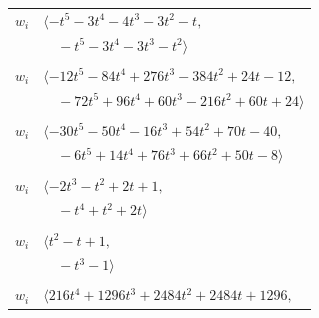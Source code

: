 \documentclass[11pt]{article}
\begin{document}
\begin{longtable}{@{}ll@{}}
$w_i$ & $\langle -t^{5}-3t^{4}-4t^{3}-3t^{2}-t,$\\
 & $\quad -t^{5}-3t^{4}-3t^{3}-t^{2}\rangle$\\
\addlinespace[2pt]
\multicolumn{2}{@{}p{0.97\textwidth}@{}}{$i=39$, $D_i=1$, $\rho_{ij}$: $0{:}2, \allowbreak 3{:}1, \allowbreak 5{:}2, \allowbreak 7{:}2, \allowbreak 11{:}1, \allowbreak 13{:}1, \allowbreak 14{:}2, \allowbreak 16{:}2, \allowbreak 20{:}2, \allowbreak 22{:}2, \allowbreak 23{:}1, \allowbreak 25{:}2, \allowbreak 28{:}1, \allowbreak 30{:}1, \allowbreak 31{:}1, \allowbreak 36{:}2, \allowbreak 41{:}1, \allowbreak 43{:}1, \allowbreak 45{:}1$}\\
$w_i$ & $\langle -12t^{5}-84t^{4}+276t^{3}-384t^{2}+24t-12,$\\
 & $\quad -72t^{5}+96t^{4}+60t^{3}-216t^{2}+60t+24\rangle$\\
\addlinespace[2pt]
\multicolumn{2}{@{}p{0.97\textwidth}@{}}{$i=40$, $D_i=1$, $\rho_{ij}$: $0{:}2, \allowbreak 3{:}1, \allowbreak 8{:}1, \allowbreak 11{:}2, \allowbreak 18{:}1, \allowbreak 20{:}2, \allowbreak 22{:}1, \allowbreak 27{:}1, \allowbreak 31{:}1, \allowbreak 32{:}2, \allowbreak 34{:}2, \allowbreak 35{:}2$}\\
$w_i$ & $\langle -30t^{5}-50t^{4}-16t^{3}+54t^{2}+70t-40,$\\
 & $\quad -6t^{5}+14t^{4}+76t^{3}+66t^{2}+50t-8\rangle$\\
\addlinespace[2pt]
\multicolumn{2}{@{}p{0.97\textwidth}@{}}{$i=41$, $D_i=1$, $\rho_{ij}$: $5{:}1, \allowbreak 19{:}2, \allowbreak 39{:}2, \allowbreak 45{:}1$}\\
$w_i$ & $\langle -2t^{3}-t^{2}+2t+1,$\\
 & $\quad -t^{4}+t^{2}+2t\rangle$\\
\addlinespace[2pt]
\multicolumn{2}{@{}p{0.97\textwidth}@{}}{$i=42$, $D_i=1$, $\rho_{ij}$: $1{:}2, \allowbreak 9{:}2, \allowbreak 12{:}2, \allowbreak 19{:}1, \allowbreak 29{:}1, \allowbreak 43{:}2$}\\
$w_i$ & $\langle t^{2}-t+1,$\\
 & $\quad -t^{3}-1\rangle$\\
\addlinespace[2pt]
\multicolumn{2}{@{}p{0.97\textwidth}@{}}{$i=43$, $D_i=27$, $\rho_{ij}$: $2{:}1, \allowbreak 3{:}1, \allowbreak 8{:}1, \allowbreak 12{:}2, \allowbreak 19{:}1, \allowbreak 21{:}2, \allowbreak 26{:}1, \allowbreak 31{:}2, \allowbreak 32{:}1, \allowbreak 33{:}2, \allowbreak 38{:}1, \allowbreak 39{:}2, \allowbreak 42{:}1, \allowbreak 46{:}1$}\\
$w_i$ & $\langle 216t^{4}+1296t^{3}+2484t^{2}+2484t+1296,$\\

\end{longtable}
\end{document}
